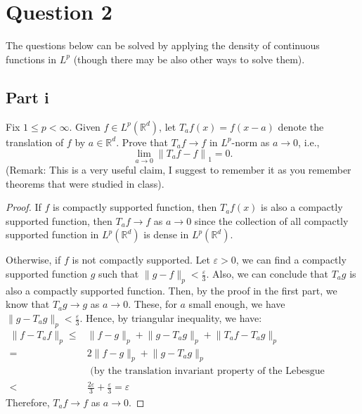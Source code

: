 \section{Question 2}

\begin{question}
    The questions below can be solved by applying the density of continuous functions in $L^p$ (though there may be also other ways to solve them).
\end{question}

\subsection{Part i}

\begin{question}
    Fix $1 \leq p<\infty$. Given $f \in L^p\left(\mathbb{R}^d\right)$, let $T_a f(x)=f(x-a)$ denote the translation of $f$ by $a \in \mathbb{R}^d$. Prove that $T_a f \rightarrow f$ in $L^p$-norm as $a \rightarrow 0$, i.e.,
    $$
    \lim _{a \rightarrow 0}\left\|T_a f-f\right\|_1=0 .
    $$
    (Remark: This is a very useful claim, I suggest to remember it as you remember theorems that were studied in class).
\end{question}

\begin{answer}
    \begin{proof}
        If $f$ is compactly supported function, then $T_af(x)$ is also a compactly supported function, then $T_af \to f$ as $a \to 0$ since the collection of all compactly supported function in $L^{p}(\mathbb{R}^d)$ is dense in $L^{p}(\mathbb{R}^d)$. 
        
        Otherwise, if $f$ is not compactly supported. Let $\varepsilon > 0$, we can find a compactly supported function $g$ such that $\lVert g - f \rVert_p < \tfrac{\varepsilon}{3}$. Also, we can conclude that $T_ag$ is also a compactly supported function. Then, by the proof in the first part, we know that $T_ag \to g$ as $a \to 0$. These, for $a$ small enough, we have $\lVert g - T_ag \rVert_p < \tfrac{\varepsilon}{3}$. Hence, by triangular inequality, we have:
        \begin{equation}
            \begin{aligned}
                \lVert f - T_af \rVert_p \leq& \lVert f - g \rVert_p + \lVert g - T_ag \rVert_p + \lVert T_af - T_ag \rVert_p\\
                = &2\lVert f - g \rVert_p + \lVert g - T_ag \rVert_p\\
                &\text{ (by the translation invariant property of the Lebesgue measure)}\\
                <& \tfrac{2\varepsilon}{3} + \tfrac{\varepsilon}{3} = \varepsilon
            \end{aligned}
        \end{equation}
        Therefore, $T_af \to f$ as $a \to 0$.
    \end{proof}
\end{answer}

